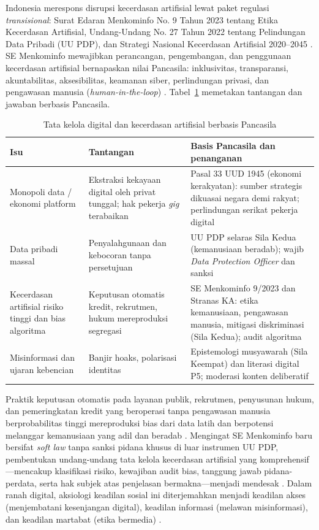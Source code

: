 \documentclass[journal]{IEEEtran}
\begin{document}
Indonesia merespons disrupsi kecerdasan artifisial lewat paket regulasi \textit{transisional}: Surat Edaran Menkominfo No. 9 Tahun 2023 tentang Etika Kecerdasan Artifisial, Undang-Undang No. 27 Tahun 2022 tentang Pelindungan Data Pribadi (UU PDP), dan Strategi Nasional Kecerdasan Artifisial 2020--2045 \cite{kominfo2023,uupdp2022}. SE Menkominfo mewajibkan perancangan, pengembangan, dan penggunaan kecerdasan artifisial bernapaskan nilai Pancasila: inklusivitas, transparansi, akuntabilitas, aksesibilitas, keamanan siber, perlindungan privasi, dan pengawasan manusia (\textit{human-in-the-loop}) \cite{kominfo2023}. Tabel~\ref{tab:ai} memetakan tantangan dan jawaban berbasis Pancasila.

\begin{table}[!htbp]
\centering
\footnotesize
\renewcommand{\arraystretch}{1.25}
\caption{Tata kelola digital dan kecerdasan artifisial berbasis Pancasila}
\label{tab:ai}
\begin{tabular}{@{}p{2.4cm}p{3.2cm}p{8.0cm}@{}}
\toprule
\textbf{Isu} & \textbf{Tantangan} & \textbf{Basis Pancasila dan penanganan} \\
\midrule
Monopoli data / ekonomi platform & Ekstraksi kekayaan digital oleh privat tunggal; hak pekerja \textit{gig} terabaikan & Pasal 33 UUD 1945 (ekonomi kerakyatan): sumber strategis dikuasai negara demi rakyat; perlindungan serikat pekerja digital \cite{uud1945,hatta1977} \\
\addlinespace
Data pribadi massal & Penyalahgunaan dan kebocoran tanpa persetujuan & UU PDP selaras Sila Kedua (kemanusiaan beradab); wajib \textit{Data Protection Officer} dan sanksi \cite{uupdp2022} \\
\addlinespace
Kecerdasan artifisial risiko tinggi dan bias algoritma & Keputusan otomatis kredit, rekrutmen, hukum mereproduksi segregasi & SE Menkominfo 9/2023 dan Stranas KA: etika kemanusiaan, pengawasan manusia, mitigasi diskriminasi (Sila Kedua); audit algoritma \cite{kominfo2023} \\
\addlinespace
Misinformasi dan ujaran kebencian & Banjir hoaks, polarisasi identitas & Epistemologi musyawarah (Sila Keempat) dan literasi digital P5; moderasi konten deliberatif \cite{effend2024,kamalashif2023} \\
\bottomrule
\end{tabular}
\end{table}

Praktik keputusan otomatis pada layanan publik, rekrutmen, penyusunan hukum, dan pemeringkatan kredit yang beroperasi tanpa pengawasan manusia berprobabilitas tinggi mereproduksi bias dari data latih dan berpotensi melanggar kemanusiaan yang adil dan beradab \cite{kominfo2023}. Mengingat SE Menkominfo baru bersifat \textit{soft law} tanpa sanksi pidana khusus di luar instrumen UU PDP, pembentukan undang-undang tata kelola kecerdasan artifisial yang komprehensif---mencakup klasifikasi risiko, kewajiban audit bias, tanggung jawab pidana-perdata, serta hak subjek atas penjelasan bermakna---menjadi mendesak \cite{kominfo2023,uupdp2022}. Dalam ranah digital, aksiologi keadilan sosial ini diterjemahkan menjadi keadilan akses (menjembatani kesenjangan digital), keadilan informasi (melawan misinformasi), dan keadilan martabat (etika bermedia) \cite{effend2024,kamalashif2023}.
\end{document}
